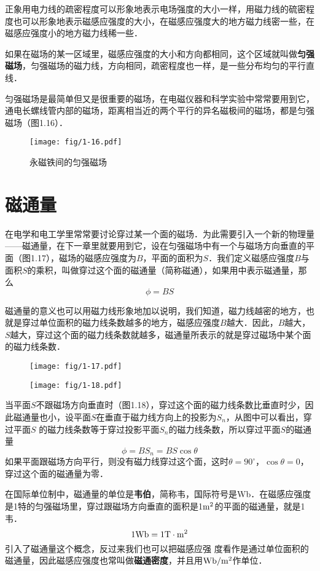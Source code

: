 正象用电力线的疏密程度可以形象地表示电场强度的大小一样，用磁力线的硫密程度也可以形象地表示磁感应强度的大小，在磁感应强度大的地方磁力线密一些，在磁感应强度小的地方磁力线稀一些．

如果在磁场的某一区域里，磁感应强度的大小和方向都相同，这个区域就叫做\textbf{匀强磁场}，匀强磁场的磁力线，方向相同，疏密程度也一样，是一些分布均匀的平行直线．

匀强磁场是最简单但又是很重要的磁场，在电磁仪器和科学实验中常常要用到它，通电长螺线管内部的磁场，距离相当近的两个平行的异名磁极间的磁场，都是匀强磁场（图1.16）．

\begin{figure}[htp]\centering
\texttt{[image: fig/1-16.pdf]}
\caption{永磁铁间的匀强磁场}
\end{figure}

\section{磁通量}
在电学和电工学里常常要讨论穿过某一个面的磁场．为此需要引入一个新的物理量——磁通量，在下一章里就要用到它，设在匀强磁场中有一个与磁场方向垂直的平面（图1.17），磁场的磁感应强度为$B$，平面的面积为$S$．我们定义磁感应强度$B$与面积$S$的乘积，叫做穿过这个面的磁通量（简称磁通），如果用中表示磁通量，那么
\[\phi=BS \]

磁通量的意义也可以用磁力线形象地加以说明，我们知道，磁力线越密的地方，也就是穿过单位面积的磁力线条数越多的地方，磁感应强度$B$越大．因此，$B$越大，$S$越大，穿过这个面的磁力线条数就越多，磁通量所表示的就是穿过磁场中某个面的磁力线条数．

\begin{figure}[htp]
\centering
\begin{minipage}[t]{0.48\textwidth}
\centering
\texttt{[image: fig/1-17.pdf]}
\caption{}
\end{minipage}
\begin{minipage}[t]{0.48\textwidth}
\centering
\texttt{[image: fig/1-18.pdf]}
\caption{}
\end{minipage}
\end{figure}


当平面$S$不跟磁场方向垂直时（图1.18），穿过这个面的磁力线条数比垂直时少，因此磁通量也小，设平面$S$在垂直于磁力线方向上的投影为$S_n$，从图中可以看出，穿过平面$S$
的磁力线条数等于穿过投影平面$S_n$的磁力线条数，所以穿过平面$S$的磁通量
\[\phi=BS_n=BS\cos\theta\]
如果平面跟磁场方向平行，则没有磁力线穿过这个面，这时$\theta=90^\circ$，$\cos\theta=0$，穿过这个面的磁通量为零．

在国际单位制中，磁通量的单位是\textbf{韦伯}，简称韦，国际符号是Wb．在磁感应强度是1特的匀强磁场里，穿过跟磁场方向垂直的面积是1${\rm m^2}$的平面的磁通量，就是1韦．
\[1{\rm Wb}=1{\rm T\cdot m^2}\]
引入了磁通量这个概念，反过来我们也可以把磁感应强
度看作是通过单位面积的磁通量，因此磁感应强度也常叫做\textbf{磁通密度}，并且用${\rm Wb}/{\rm m^2}$作单位．


